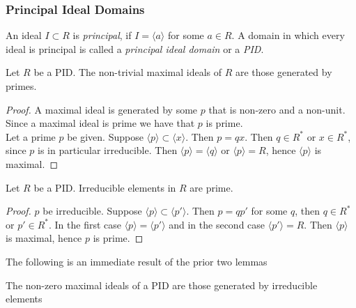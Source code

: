 \subsubsection{Principal Ideal Domains}
    \begin{definition}
        An ideal $I\subset R$ is \textit{principal}, if $I=\langle a\rangle$ for some $a \in R$. A domain in which every ideal is principal is called a \textit{principal ideal domain} or a \textit{PID}. 
    \end{definition}
    \begin{lemma}\label{InPIDPrimeIdealsAreMaximal}
        Let $R$ be a PID. The non-trivial maximal ideals of $R$ are those generated by primes.
    \end{lemma}
    \begin{proof}
        A maximal ideal is generated by some $p$ that is non-zero and a non-unit. Since a maximal ideal is prime we have that $p$ is prime.\\
        Let a prime $p$ be given. Suppose $\langle p\rangle \subset \langle x\rangle$. Then $p=qx$. Then $q\in R^\ast$ or $x\in R^\ast$, since $p$ is in particular irreducible. Then $\langle p\rangle = \langle q\rangle$ or $\langle p\rangle = R$, hence $\langle p\rangle$ is maximal. 
    \end{proof}
    \begin{lemma}\label{InPIDIrreduciblesArePrimes}
        Let $R$ be a PID. Irreducible elements in $R$ are prime. 
    \end{lemma}
    \begin{proof}
         $p$ be irreducible. Suppose $\langle p\rangle \subset \langle p'\rangle$. Then $p = qp'$ for some $q$, then $q\in R^\ast$ or $p'\in R^\ast$. In the first case $\langle p \rangle = \langle p'\rangle$ and in the second case $\langle p'\rangle = R$. 
        Then $\langle p \rangle$ is maximal, hence $p$ is prime. 
    \end{proof}
    
    The following is an immediate result of the prior two lemmas
    \begin{corollary}\label{MaximalIdealsAreThoseGeneratedByIrreducibleElements}
        The non-zero maximal ideals of a PID are those generated by irreducible elements 
    \end{corollary}

